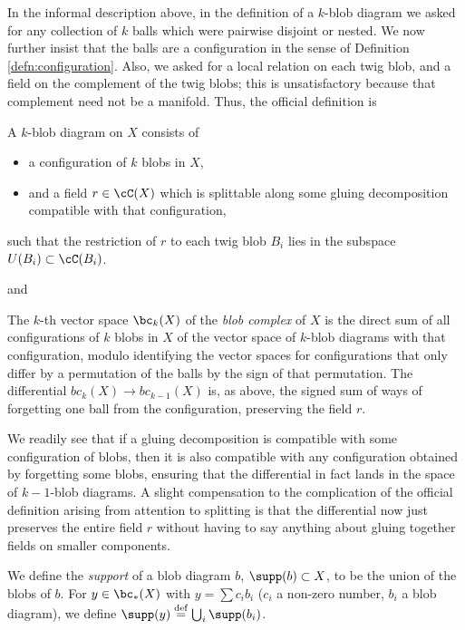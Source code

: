 In the informal description above, in the definition of a $k$-blob diagram we asked for any collection of $k$ balls which were pairwise disjoint or nested. We now further insist that the balls are a configuration in the sense of Definition \ref{defn:configuration}. Also, we asked for a local relation on each twig blob, and a field on the complement of the twig blobs; this is unsatisfactory because that complement need not be a manifold. Thus, the official definition is
\begin{defn}
\label{defn:blob-diagram}
A $k$-blob diagram on $X$ consists of
\begin{itemize}
\item a configuration of $k$ blobs in $X$,
\item and a field $r \in \cC(X)$ which is splittable along some gluing decomposition compatible with that configuration,
\end{itemize}
such that
the restriction of $r$ to each twig blob $B_i$ lies in the subspace $U(B_i) \subset \cC(B_i)$.
\end{defn}
and
\begin{defn}
\label{defn:blobs}
The $k$-th vector space $\bc_k(X)$ of the \emph{blob complex} of $X$ is the direct sum of all configurations of $k$ blobs in $X$ of the vector space of $k$-blob diagrams with that configuration, modulo identifying the vector spaces for configurations that only differ by a permutation of the balls by the sign of that permutation. The differential $bc_k(X) \to bc_{k-1}(X)$ is, as above, the signed sum of ways of forgetting one ball from the configuration, preserving the field $r$.
\end{defn}
We readily see that if a gluing decomposition is compatible with some configuration of blobs, then it is also compatible with any configuration obtained by forgetting some blobs, ensuring that the differential in fact lands in the space of $k{-}1$-blob diagrams.
A slight compensation to the complication of the official definition arising from attention to splitting is that the differential now just preserves the entire field $r$ without having to say anything about gluing together fields on smaller components.





We define the {\it support} of a blob diagram $b$, $\supp(b) \sub X$, 
to be the union of the blobs of $b$.
For $y \in \bc_*(X)$ with $y = \sum c_i b_i$ ($c_i$ a non-zero number, $b_i$ a blob diagram),
we define $\supp(y) \deq \bigcup_i \supp(b_i)$.

